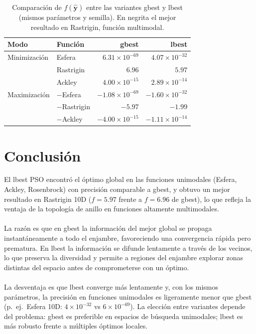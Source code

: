 \documentclass[11pt]{article}
\begin{document}
\begin{table}[H]
\centering
\begin{tabular}{llrr}
\hline\hline
Modo & Funci\'on & gbest & lbest \\
\hline
Minimizaci\'on & Esfera    & $6.31\times10^{-69}$ & $4.07\times10^{-32}$ \\
               & Rastrigin & $6.96$               & $\mathbf{5.97}$ \\
               & Ackley    & $4.00\times10^{-15}$ & $2.89\times10^{-14}$ \\
\hline
Maximizaci\'on & $-$Esfera    & $-1.08\times10^{-69}$ & $-1.60\times10^{-32}$ \\
               & $-$Rastrigin & $-5.97$               & $\mathbf{-1.99}$ \\
               & $-$Ackley    & $-4.00\times10^{-15}$ & $-1.11\times10^{-14}$ \\
\hline\hline
\end{tabular}
\caption{Comparaci\'on de $f(\hat{\mathbf{y}})$ entre las variantes gbest y lbest (mismos par\'ametros y semilla). En negrita el mejor resultado en Rastrigin, funci\'on multimodal.}
\end{table}

\section{Conclusi\'on}

El lbest PSO encontr\'o el \'optimo global en las funciones unimodales (Esfera, Ackley, Rosenbrock) con precisi\'on comparable a gbest, y obtuvo un mejor resultado en Rastrigin 10D ($f=5.97$ frente a $f=6.96$ de gbest), lo que refleja la ventaja de la topolog\'ia de anillo en funciones altamente multimodales.\\\\
La raz\'on es que en gbest la informaci\'on del mejor global se propaga instant\'aneamente a todo el enjambre, favoreciendo una convergencia r\'apida pero prematura. En lbest la informaci\'on se difunde lentamente a trav\'es de los vecinos, lo que preserva la diversidad y permite a regiones del enjambre explorar zonas distintas del espacio antes de comprometerse con un \'optimo.\\\\
La desventaja es que lbest converge m\'as lentamente y, con los mismos par\'ametros, la precisi\'on en funciones unimodales es ligeramente menor que gbest (p.~ej.\ Esfera 10D: $4\times10^{-32}$ vs $6\times10^{-69}$). La elecci\'on entre variantes depende del problema: gbest es preferible en espacios de b\'usqueda unimodales; lbest es m\'as robusto frente a m\'ultiples \'optimos locales.
\end{document}
